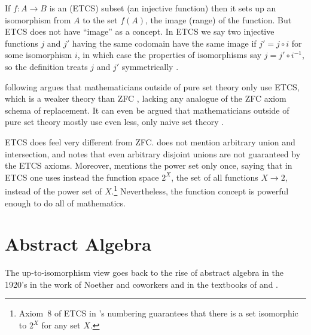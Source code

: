 \documentclass[11pt]{article}
\begin{document}
If $f : A \to B$ is an (ETCS) subset (an injective function) then it
sets up an isomorphism from $A$ to the set $f(A)$, the image (range)
of the function.
But ETCS does not have ``image'' as a concept.  In ETCS we say two injective
functions $j$ and $j'$ having the same codomain have the same
image if $j' = j \circ i$ for some isomorphism $i$, in which case the properties
of isomorphisms say $j = j' \circ i^{-1}$, so the definition treats $j$ and
$j'$ symmetrically \citep[Section ``Building on the axioms'']{leinster}.

\citet{leinster} following \citet{lawvere-etcs} argues that mathematicians
outside of pure set theory \citep[the subject of][]{jech} only use ETCS,
which is a weaker theory than ZFC
\citep[Section ``How strong are the axioms?'']{leinster}, lacking any analogue
of the ZFC axiom schema of replacement.
It can even be argued that mathematicians outside of pure set theory mostly
use even less, only naive set theory \citep{halmos}.

ETCS does feel very different from ZFC.  \citet{leinster} does not mention
arbitrary union and intersection, and notes that even arbitrary disjoint
unions are not guaranteed by the ETCS axioms.  Moreover, \citet{leinster}
mentions the power set only once, saying that in ETCS one uses instead
the function space $2^X$, the set of all functions $X \to 2$,
instead of the power set of $X$.\footnote{Axiom~8 of ETCS
in \citeauthor{leinster}'s numbering guarantees that there is a set isomorphic
to $2^X$ for any set $X$.}
Nevertheless, the function concept is powerful enough to do all of mathematics.

\section{Abstract Algebra}
\label{sec:abstract-algebra}

The up-to-isomorphism view goes back to the rise of abstract algebra in
the 1920's in the work of Noether and coworkers
\citep[Chapter~6]{kleiner} and in the textbooks of
\citet{van-der-waerden} and \citet{birkhoff-maclane}.
\end{document}
